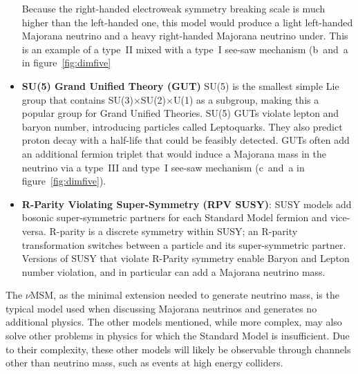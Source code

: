 \documentclass[/main.tex]{subfiles}
\begin{document}
\begin{itemize}
  Because the right-handed electroweak symmetry breaking scale is much higher than the left-handed one, this model would produce a light left-handed Majorana neutrino and a heavy right-handed Majorana neutrino under.
  This is an example of a type~II mixed with a type~I see-saw mechanism (b~and~a in figure~\ref{fig:dimfive}
\item \textbf{SU(5) Grand Unified Theory (GUT)} SU(5) is the smallest simple Lie group that contains SU(3)$\times$SU(2)$\times$U(1) as a subgroup, making this a popular group for Grand Unified Theories.
  SU(5) GUTs violate lepton and baryon number, introducing particles called Leptoquarks.
  They also predict proton decay with a half-life that could be feasibly detected.
  GUTs often add an additional fermion triplet that would induce a Majorana mass in the neutrino via a type~III and type~I see-saw mechanism (c~and~a in figure~\ref{fig:dimfive}).
\item \textbf{R-Parity Violating Super-Symmetry (RPV SUSY)}: SUSY models add bosonic super-symmetric partners for each Standard Model fermion and vice-versa.
  R-parity is a discrete symmetry within SUSY; an R-parity transformation switches between a particle and its super-symmetric partner.
  Versions of SUSY that violate R-Parity symmetry enable Baryon and Lepton number violation, and in particular can add a Majorana neutrino mass.
\end{itemize}
The $\nu$MSM, as the minimal extension needed to generate neutrino mass, is the typical model used when discussing Majorana neutrinos and generates no additional physics.
The other models mentioned, while more complex, may also solve other problems in physics for which the Standard Model is insufficient.
Due to their complexity, these other models will likely be observable through channels other than neutrino mass, such as events at high energy colliders.
\end{document}
